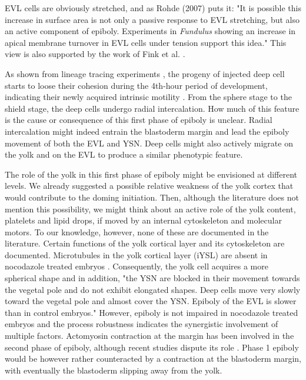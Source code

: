 EVL cells are obviously stretched, and as Rohde (2007) \cite{Rohde:2007ba} puts it: "It is possible this increase in surface area is not only a passive response to EVL stretching, but also an active component of epiboly. Experiments in \textit{Fundulus} showing an increase in apical membrane turnover in EVL cells under tension support this idea." This view is also supported by the work of Fink et al. \cite{Fink:1996un}.

As shown from lineage tracing experiments \cite{Kimmel:1985vc}, the progeny of injected deep cell starts to loose their cohesion during the 4th-hour period of development, indicating their newly acquired intrinsic motility \cite{Warga:1990vu}. From the sphere stage to the shield stage, the deep cells undergo radial intercalation. How much of this feature is the cause or consequence of this first phase of epiboly is unclear. Radial intercalation might indeed entrain the blastoderm margin and lead the epiboly movement of both the EVL and YSN. Deep cells might also actively migrate on the yolk and on the EVL to produce a similar phenotypic feature.

The role of the yolk in this first phase of epiboly might be envisioned at different levels. We already suggested a possible relative weakness of the yolk cortex that would contribute to the doming initiation. Then, although the literature does not mention this possibility, we might think about an active role of the yolk content, platelets and lipid drops, if moved by an internal cytoskeleton and molecular motors. To our knowledge, however, none of these are documented in the literature. Certain functions of the yolk cortical layer and its cytoskeleton are documented. Microtubules in the yolk cortical layer (iYSL) are absent in nocodazole treated embryos \cite{SolnicaKrezel:1994wl}. Consequently, the yolk cell acquires a more spherical shape and in addition, "the YSN are blocked in their movement towards the vegetal pole and do not exhibit elongated shapes. Deep cells move very slowly toward the vegetal pole and almost cover the YSN. Epiboly of the EVL is slower than in control embryos." However, epiboly is not impaired in nocodazole treated embryos and the process robustness indicates the synergistic involvement of multiple factors. Actomyosin contraction at the margin has been involved in the second phase of epiboly, although recent studies dispute its role \cite{Behrndt:2012gy}. Phase 1 epiboly would be however rather counteracted by a contraction at the blastoderm margin, with eventually the blastoderm slipping away from the yolk.


